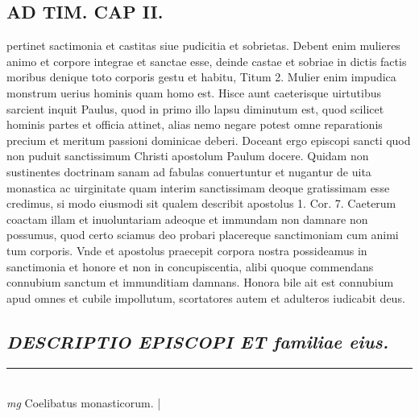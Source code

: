 \documentclass{article}
\begin{document}
\begin{pages}
\section*{AD TIM. CAP II. }
\marginpar{[ p.122 ]}\pstart pertinet sactimonia et castitas siue pudicitia et sobrietas. Debent enim mulieres animo et corpore integrae et sanctae esse, deinde castae et sobriae in dictis factis moribus denique toto corporis gestu et habitu, Titum 2. Mulier enim impudica monstrum uerius hominis quam homo est. Hisce aunt caeterisque uirtutibus sarcient inquit Paulus, quod in primo illo lapsu diminutum est, quod scilicet hominis partes et officia attinet, alias nemo negare potest omne reparationis precium et meritum passioni dominicae deberi. Doceant ergo episcopi sancti quod non puduit sanctissimum Christi apostolum Paulum docere. Quidam non sustinentes doctrinam sanam ad fabulas conuertuntur et nugantur de uita monastica ac uirginitate quam interim sanctissimam deoque gratissimam esse credimus, si modo eiusmodi sit qualem describit apostolus 1. Cor. 7. Caeterum coactam illam et inuoluntariam adeoque et immundam non damnare non possumus, quod certo sciamus deo probari placereque sanctimoniam cum animi tum corporis. Vnde et apostolus praecepit corpora nostra possideamus in sanctimonia et honore et non in concupiscentia, alibi quoque commendans connubium sanctum et immunditiam damnans. Honora bile ait est connubium apud omnes et cubile impollutum, scortatores autem et adulteros iudicabit deus.  \pend
{}
{}
\subsection*{\textit{DESCRIPTIO EPISCOPI ET familiae eius. }}
\vspace{0.5cm}\noindent
\vspace{0.2cm}\rule{1cm}{0.2pt}\\ 
\hspace{0.2cm}\textit{mg}
\footnotesize Coelibatus monasticorum. 
\normalsize| 

\end{pages}
\end{document}
